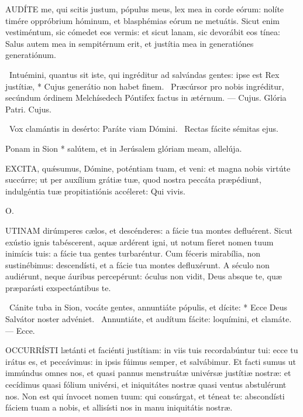 
\lettrine[lines=2]{A}{UDÍTE} me, qui scitis justum, pópulus meus, lex mea in corde eórum: nolíte timére oppróbrium hóminum, et blasphémias eórum ne metuátis. Sicut enim vestiméntum, sic cómedet eos vermis: et sicut lanam, sic devorábit eos tínea: Salus autem mea in sempitérnum erit, et justítia mea in generatiónes generatiónum.

\R\ Intuémini, quantus sit iste, qui ingréditur ad salvándas gentes: ipse est Rex justítiæ, * Cujus generátio non habet finem. \V\ Præcúrsor pro nobis ingréditur, secúndum órdinem Melchísedech Póntifex factus in ætérnum. --- Cujus. Glória Patri. Cujus.

\V\ Vox clamántis in desérto: Paráte viam Dómini. \R\ Rectas fácite sémitas ejus.

 Ponam in Sion * salútem, et in Jerúsalem glóriam meam, allelúja.



\lettrine[lines=2]{E}{XCITA}, quǽsumus, Dómine, poténtiam tuam, et veni: et magna nobis virtúte succúrre; ut per auxílium grátiæ tuæ, quod nostra peccáta præpédiunt, indulgéntia tuæ propitiatiónis accéleret: Qui vivis.

 O. 

\sectionornament




\lettrine[lines=2]{U}{TINAM} dirúmperes cælos, et descénderes: a fácie tua montes defluérent. Sicut exústio ignis tabéscerent, aquæ ardérent igni, ut notum fíeret nomen tuum inimícis tuis: a fácie tua gentes turbaréntur. Cum féceris mirabília, non sustinébimus: descendísti, et a fácie tua montes defluxérunt. A século non audiérunt, neque áuribus percepérunt: óculus non vidit, Deus absque te, quæ præparásti exspectántibus te.

\R\ Cánite tuba in Sion, vocáte gentes, annuntiáte pópulis, et dícite: * Ecce Deus Salvátor noster advéniet. \V\ Annuntiáte, et audítum fácite: loquímini, et clamáte. --- Ecce.


\lettrine[lines=2]{O}{CCURRÍSTI} lætánti et faciénti justítiam: in viis tuis recordabúntur tui: ecce tu irátus es, et peccávimus: in ipsis fúimus semper, et salvábimur. Et facti sumus ut immúndus omnes nos, et quasi pannus menstruátæ univérsæ justítiæ nostræ: et cecídimus quasi fólium univérsi, et iniquitátes nostræ quasi ventus abstulérunt nos. Non est qui ínvocet nomen tuum: qui consúrgat, et téneat te: abscondísti fáciem tuam a nobis, et allisísti nos in manu iniquitátis nostræ.

